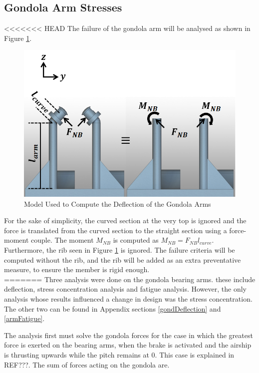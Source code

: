 \documentclass[../main.tex]{subfiles}
\begin{document}
\subsection{Gondola Arm Stresses} \label{bearingArm}
<<<<<<< HEAD
The failure of the gondola arm will be analysed as shown in Figure \ref{fig:deflection}. 

\begin{figure}[H]
	\centering
	\includegraphics[width=.8\linewidth]{img/gondola/armDeflection.PNG}
	\caption{Model Used to Compute the Deflection of the Gondola Arms}
	\label{fig:deflection}
\end{figure}

For the sake of simplicity, the curved section at the very top is ignored and the force is translated from the curved section to the straight section using a force-moment couple. The moment $M_{NB}$ is computed as $M_{NB}=F_{NB}l_{curve}$. Furthermore, the rib seen in Figure \ref{fig:deflection} is ignored. The failure criteria will be computed without the rib, and the rib will be added as an extra preventative measure, to ensure the member is rigid enough.\\

=======
Three analysis were done on the gondola bearing arms. these include deflection, stress concentration analysis and fatigue analysis. However, the only analysis whose results influenced a change in design was the stress concentration. The other two can be found in Appendix sections \ref{gondDeflection} and \ref{armFatigue}.

The analysis first must solve the gondola forces for the case in which the greatest force is exerted on the bearing arms, when the brake is activated and the airship is thrusting upwards while the pitch remains at 0. This case is explained in REF???. The sum of forces acting on the gondola are. 
\end{document}
